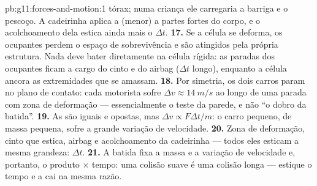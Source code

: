 \begin{solution}{pb:g11:forces-and-motion:1}
tórax; numa criança ele carregaria a barriga e o pescoço. A cadeirinha
aplica a  (menor) a partes fortes do corpo, e o acolchoamento dela
estica ainda mais o $\Delta t$.
\textbf{17.} Se a célula se deforma, os ocupantes perdem o espaço de
sobrevivência e são atingidos pela própria estrutura. Nada deve bater
diretamente na célula rígida: as paradas dos ocupantes ficam a cargo do
cinto e do airbag ($\Delta t$ longo), enquanto a célula ancora as
extremidades que se amassam.
\textbf{18.} Por simetria, os dois carros param no plano de contato: cada
motorista sofre $\Delta v \approx \qty{14}{m/s}$ ao longo de uma parada
com zona de deformação --- essencialmente o teste da parede, e não ``o
dobro da batida''.
\textbf{19.} As  são iguais e opostas, mas
$\Delta v \propto F\Delta t/m$: o carro pequeno, de massa pequena, sofre
a grande variação de velocidade.
\textbf{20.} Zona de deformação, cinto que estica, airbag e acolchoamento
da cadeirinha --- todos eles esticam a mesma grandeza: $\Delta t$.
\textbf{21.} A batida fixa a massa e a variação de velocidade e,
portanto, o produto  $\times$ tempo: uma colisão suave é uma colisão
longa --- estique o tempo e a  cai na mesma razão.
\end{solution}
